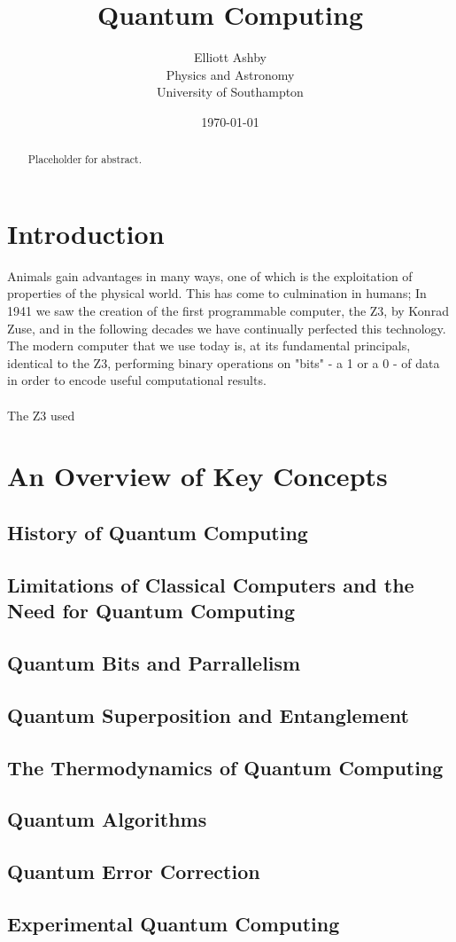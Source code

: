 \documentclass[12pt]{amsart}
\title{Quantum Computing}
\author{Elliott Ashby \\ Physics and Astronomy \\ University of Southampton}
\date{\monthyeardate\today}
\begin{document}
\begin{abstract}
    Placeholder for abstract.
\end{abstract}
\maketitle
\tableofcontents
\section{Introduction}
Animals gain advantages in many ways, one of which is the exploitation of properties of the physical world. This has come to culmination in humans; In 1941 we saw the creation of the first programmable computer, the Z3, by Konrad Zuse, and in the following decades we have continually perfected this technology. The modern computer that we use today is, at its fundamental principals, identical to the Z3, performing binary operations on "bits" - a 1 or a 0 - of data in order to encode useful computational results. \\
\\
The Z3 used 

\section{An Overview of Key Concepts}
\subsection{History of Quantum Computing}
\subsection{Limitations of Classical Computers and the Need for Quantum Computing}
\subsection{Quantum Bits and Parrallelism}
\subsection{Quantum Superposition and Entanglement}
\subsection{The Thermodynamics of Quantum Computing}
\subsection{Quantum Algorithms}
\subsection{Quantum Error Correction}
\subsection{Experimental Quantum Computing}
\end{document}
